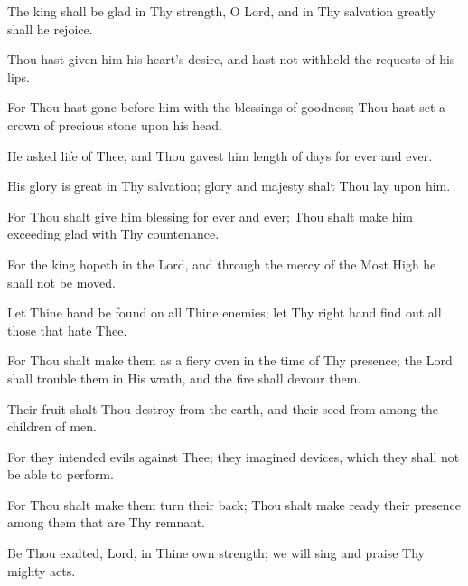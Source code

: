 The king shall be glad in Thy strength, O Lord, and in Thy salvation greatly shall he rejoice.

Thou hast given him his heart's desire, and hast not withheld the requests of his lips.

For Thou hast gone before him with the blessings of goodness; Thou hast set a crown of precious stone upon his head.

He asked life of Thee, and Thou gavest him length of days for ever and ever.

His glory is great in Thy salvation; glory and majesty shalt Thou lay upon him.

For Thou shalt give him blessing for ever and ever; Thou shalt make him exceeding glad with Thy countenance.

For the king hopeth in the Lord, and through the mercy of the Most High he shall not be moved.

Let Thine hand be found on all Thine enemies; let Thy right hand find out all those that hate Thee.

For Thou shalt make them as a fiery oven in the time of Thy presence; the Lord shall trouble them in His wrath, and the fire shall devour them.

Their fruit shalt Thou destroy from the earth, and their seed from among the children of men.

For they intended evils against Thee; they imagined devices, which they shall not be able to perform.

For Thou shalt make them turn their back; Thou shalt make ready their presence among them that are Thy remnant.

Be Thou exalted, Lord, in Thine own strength; we will sing and praise Thy mighty acts.
